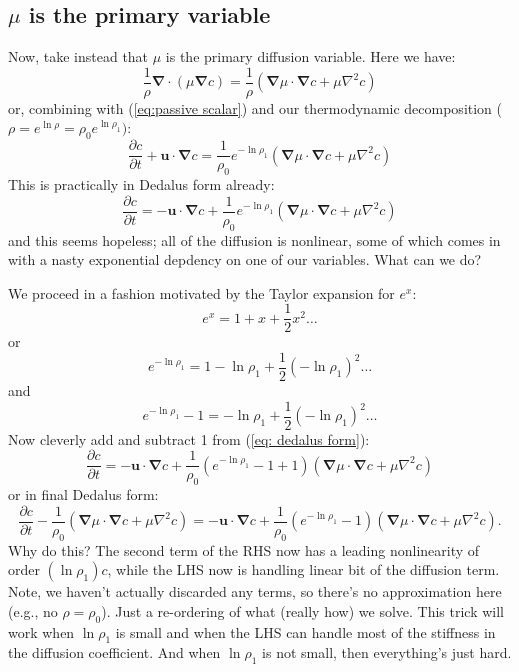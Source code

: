 \documentclass[letterpaper,12pt]{paper}
\newcommand{\del}{\ensuremath{\mathbf{\nabla}}}
\renewcommand{\vec}[1]{\ensuremath{\mathbf{#1}}}
\begin{document}
\newpage
\subsection{$\mu$ is the primary variable}
Now, take instead that $\mu$ is the primary diffusion variable.  Here we have:
\begin{equation}
\frac{1}{\rho} \del \cdot \left(\mu \del c\right) = \frac{1}{\rho}\left(\del \mu \cdot \del c + \mu \nabla^2 c\right) 
\end{equation}
or, combining with (\ref{eq:passive scalar}) and our thermodynamic decomposition ($\rho = e^{\ln \rho} = \rho_0 e^{\ln \rho_1})$:
\begin{equation}
\frac{\partial c}{\partial t} + \vec{u}\cdot\del c  = \frac{1}{\rho_0}e^{-\ln \rho_1}\left(\del \mu \cdot \del c + \mu \nabla^2 c\right) 
\end{equation}
This is practically in Dedalus form already:
\begin{equation}
\frac{\partial c}{\partial t} = -\vec{u}\cdot\del c  + \frac{1}{\rho_0}e^{-\ln \rho_1}\left(\del \mu \cdot \del c + \mu \nabla^2 c\right) 
\label{eq: dedalus form}
\end{equation}
and this seems hopeless; all of the diffusion is nonlinear, some of which comes in with a nasty exponential depdency on one of our variables.  What can we do?

We proceed in a fashion motivated by the Taylor expansion for $e^x$:
\begin{equation}
e^{x} = 1 + x + \frac{1}{2}x^2 \ldots
\end{equation}
or
\begin{equation}
e^{-\ln \rho_1} = 1 -\ln \rho_1 + \frac{1}{2}(-\ln \rho_1)^2 \ldots
\label{eq: exponential expansion}
\end{equation}
and
\begin{equation}
e^{-\ln \rho_1} - 1 = -\ln \rho_1 + \frac{1}{2}(-\ln \rho_1)^2 \ldots
\end{equation}
Now cleverly add and subtract 1 from (\ref{eq: dedalus form}):
\begin{equation}
\frac{\partial c}{\partial t} = -\vec{u}\cdot\del c  + \frac{1}{\rho_0}\left(e^{-\ln \rho_1} -1 + 1\right)\left(\del \mu \cdot \del c + \mu \nabla^2 c\right) 
\end{equation}
or in final Dedalus form:
\begin{equation}
\frac{\partial c}{\partial t} -\frac{1}{\rho_0}\left(\del \mu \cdot \del c + \mu \nabla^2 c\right) = -\vec{u}\cdot\del c  + \frac{1}{\rho_0}\left(e^{-\ln \rho_1} -1\right)\left(\del \mu \cdot \del c + \mu \nabla^2 c\right).
\end{equation}
Why do this?  The second term of the RHS now has a leading nonlinearity of order $(\ln \rho_1) c$, while the LHS now is handling linear bit of the diffusion term.  Note, we haven't actually discarded any terms, so there's no approximation here (e.g., no $\rho=\rho_0$).  Just a re-ordering of what (really how) we solve.  This trick will work when $\ln \rho_1$ is small and when the LHS can handle most of the stiffness in the diffusion coefficient.  And when $\ln \rho_1$ is not small, then everything's just hard.
\end{document}

